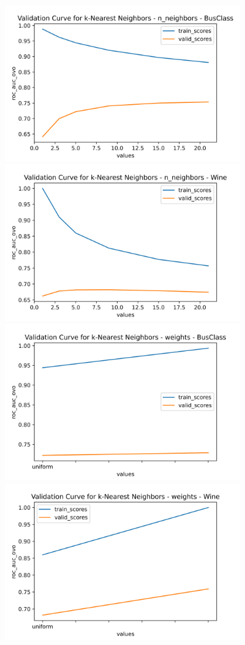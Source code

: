 \documentclass[
	letterpaper, %
]{jdf}
\begin{document}
\includegraphics[width=4in]{Figures/BusClass-0920/KNN/val_curve_0.png}
\includegraphics[width=4in]{Figures/Wine-0921/KNN/val_curve_0.png}
\includegraphics[width=4in]{Figures/BusClass-0920/KNN/val_curve_1.png}
\includegraphics[width=4in]{Figures/Wine-0921/KNN/val_curve_1.png}
\end{document}
